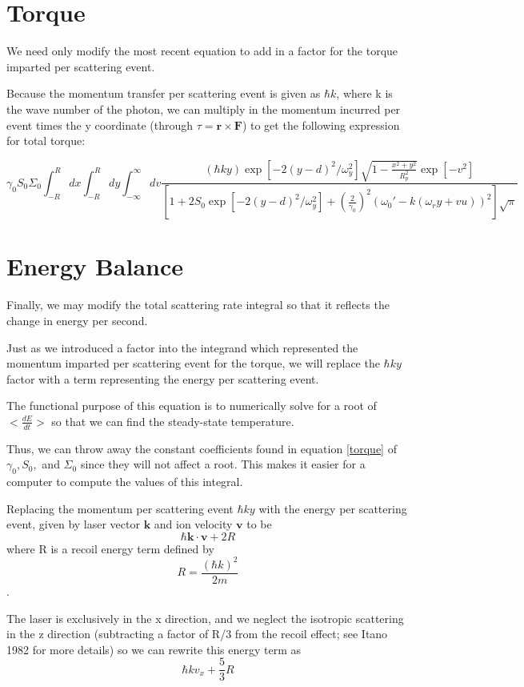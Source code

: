 \documentclass[11pt, oneside,reqno]{amsart}   	%
\newcommand{\eqn}[1]{\begin{equation}#1 \end{equation}}
\renewcommand{\vec}[1]{\textbf{#1}}
\begin{document}
 \section{Torque}

 We need only modify the most recent equation to add in a factor for the torque imparted per scattering event.
 
 Because the momentum transfer per scattering event is given as $\hbar k$, where k is the wave number of the photon, we can multiply in the momentum incurred per event times the y coordinate (through $\tau = \vec{r} \times \vec{F}$) to get the following expression for total torque:
 
 \eqn{ \gamma_0 S_0 \Sigma_0
 \int_{-R}^{R} dx \int_{-R}^R  dy \int_{-\infty}^{\infty} dv 
 \frac{
 (\hbar k y)
 \exp [ -2 (y-d)^2/\omega_y^2] \sqrt{1-\frac{x^2+y^2}{R_p^2}} \exp [-v^2]
 }
 { \left[ 1+2S_0 \exp [ -2 (y-d)^2/\omega_y^2] +\left( \frac{2}{\gamma_0} \right)^2  (\omega_0' - k(\omega_r y +v u))^2 \right]\sqrt{\pi}}
 \label{torque}
 } 
 
 \section{Energy Balance}
 
 Finally, we may modify the total scattering rate integral so that it reflects the change in energy per second.
 
 Just as we introduced a factor into the integrand which represented the momentum imparted per scattering event for the torque, we will replace the $\hbar k y$ factor with a term representing the energy per scattering event.
 
 The functional purpose of this equation is to numerically solve for a root of $< \frac{dE}{dt}>$ so that we can find the steady-state temperature.
 
 Thus, we can throw away the constant coefficients found in equation \ref{torque} of $\gamma_0, S_0,$ and $ \Sigma_0$ since they will not affect a root. This makes it easier for a computer to compute the values of this integral.
 
 Replacing the momentum per scattering event $\hbar k y$ with the energy per scattering event, given by laser vector $\vec{k}$ and ion velocity $\vec{v}$ to be
 \eqn{ \hbar \vec{k} \cdot \vec{v} + 2 R} where R is a recoil energy term defined by  \eqn{R= \frac{ (\hbar k )^2}{2m}}.
 
  The laser is exclusively in the x direction, and we neglect the isotropic scattering in the z direction (subtracting a factor of R/3 from the recoil effect; see Itano 1982 for more details) so we can rewrite this energy term as 
  \eqn{\hbar k v_x + \frac{5}{3}R}
  
\end{document}
